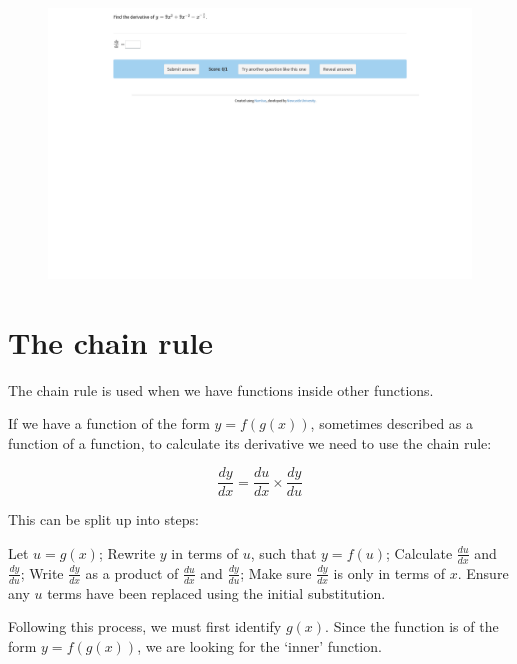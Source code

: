 \documentclass[
  a4paper,
]{scrbook}
\begin{document}
\begin{figure}

{\centering 

\href{https://numbas.mathcentre.ac.uk/question/67872/differentiation-harder-powers-negative-and-fractions-2/embed/?token=b5b58960-1ea3-4d94-9695-bc2e4070486e}{\includegraphics{./12-further-differentiation_files/figure-pdf/unnamed-chunk-1-1.png}}

}

\end{figure}

\hypertarget{the-chain-rule}{%
\section{The chain rule}\label{the-chain-rule}}

The chain rule is used when we have functions inside other functions.

If we have a function of the form \(y=f(g(x))\), sometimes described as
a function of a function, to calculate its derivative we need to use the
chain rule:

\[
\frac{dy}{dx} = \frac{du}{dx} \times \frac{dy}{du}
\]

This can be split up into steps:

Let \(u=g(x)\); Rewrite \(y\) in terms of \(u\), such that \(y=f(u)\);
Calculate \(\frac{du}{dx}\) and \(\frac{dy}{du}\); Write
\(\frac{dy}{dx}\) as a product of \(\frac{du}{dx}\) and
\(\frac{dy}{du}\); Make sure \(\frac{dy}{dx}\) is only in terms of
\(x\). Ensure any \(u\) terms have been replaced using the initial
substitution.

Following this process, we must first identify \(g(x)\). Since the
function is of the form \(y=f(g(x))\), we are looking for the `inner'
function.
\end{document}
